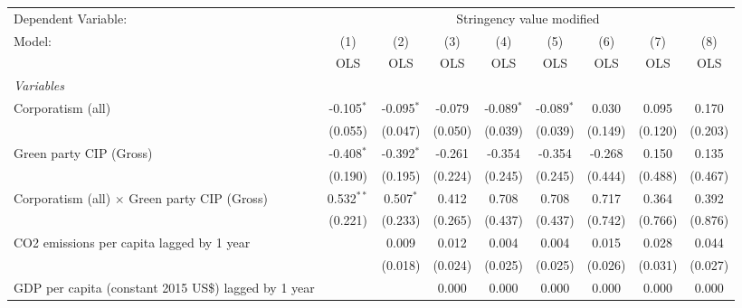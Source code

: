 
\begingroup
\centering
\begin{tabular}{lcccccccc}
   \toprule
   Dependent Variable: & \multicolumn{8}{c}{Stringency value modified}\\
   Model:                                                    & (1)          & (2)          & (3)     & (4)           & (5)           & (6)          & (7)     & (8)\\  
                                                             &  OLS         & OLS          & OLS     & OLS           & OLS           & OLS          & OLS     & OLS\\  
   \midrule
   \emph{Variables}\\
   Corporatism (all)                                         & -0.105$^{*}$ & -0.095$^{*}$ & -0.079  & -0.089$^{*}$  & -0.089$^{*}$  & 0.030        & 0.095   & 0.170\\   
                                                             & (0.055)      & (0.047)      & (0.050) & (0.039)       & (0.039)       & (0.149)      & (0.120) & (0.203)\\   
   Green party CIP (Gross)                                   & -0.408$^{*}$ & -0.392$^{*}$ & -0.261  & -0.354        & -0.354        & -0.268       & 0.150   & 0.135\\   
                                                             & (0.190)      & (0.195)      & (0.224) & (0.245)       & (0.245)       & (0.444)      & (0.488) & (0.467)\\   
   Corporatism (all) $\times$ Green party CIP (Gross)        & 0.532$^{**}$ & 0.507$^{*}$  & 0.412   & 0.708         & 0.708         & 0.717        & 0.364   & 0.392\\   
                                                             & (0.221)      & (0.233)      & (0.265) & (0.437)       & (0.437)       & (0.742)      & (0.766) & (0.876)\\   
   CO2 emissions per capita lagged by 1 year                 &              & 0.009        & 0.012   & 0.004         & 0.004         & 0.015        & 0.028   & 0.044\\   
                                                             &              & (0.018)      & (0.024) & (0.025)       & (0.025)       & (0.026)      & (0.031) & (0.027)\\   
   GDP per capita (constant 2015 US\$) lagged by 1 year      &              &              & 0.000   & 0.000         & 0.000         & 0.000        & 0.000   & 0.000\\   

\end{tabular}
